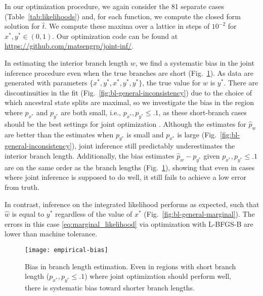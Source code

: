 \documentclass[11pt]{article}
\begin{document}
In our optimization procedure, we again consider the 81 separate cases (Table~\ref{tab:likelihoods}) and, for each function, we compute the closed form solution for $\hat{t}$.
We compute these maxima over a lattice in steps of $10^{-2}$ for $x^*,y^*\in(0,1)$.
Our optimization code can be found at \url{https://github.com/matsengrp/joint-inf/}.

In estimating the interior branch length $w$, we find a systematic bias in the joint inference procedure even when the true branches are short (Fig.~\ref{fig:empirical-bias}).
As data are generated with parameters $\{x^*, y^*, x^*, y^*, y^*\}$, the true value for $w$ is $y^*$.
There are discontinuities in the fit (Fig.~\ref{fig:bl-general-inconsistency}) due to the choice of which ancestral state splits are maximal, so we investigate the bias in the region where $p_{x^*}$ and $p_{y^*}$ are both small, i.e., $p_{x^*}, p_{y^*} \le .1$, as these short-branch cases should be the best settings for joint optimization \citep{Sagulenko2018-xl}.
Although the estimates for $\hat{p}_w$ are better than the estimates when $p_{y^*}$ is small and $p_{x^*}$ is large (Fig.~\ref{fig:bl-general-inconsistency}), joint inference still predictably underestimates the interior branch length.
Additionally, the bias estimates $\hat{p}_w-p_{y^*}$ given $p_{x^*}, p_{y^*} \le .1$ are on the same order as the branch lengths (Fig.~\ref{fig:empirical-bias}), showing that even in cases where joint inference is supposed to do well, it still fails to achieve a low error from truth.

In contrast, inference on the integrated likelihood performs as expected, such that $\hat{w}$ is equal to $y^*$ regardless of the value of $x^*$ (Fig.~\ref{fig:bl-general-marginal}).
The errors in this case \eqref{eq:marginal_likelihood} via optimization with L-BFGS-B are lower than machine tolerance.


\begin{figure}
\centering
\texttt{[image: empirical-bias]}
\caption{
Bias in branch length estimation.
Even in regions with short branch length ($p_{x^*}, p_{y^*} \le .1$) where joint optimization should perform well, there is systematic bias toward shorter branch lengths.
}
\label{fig:empirical-bias}
\end{figure}
\end{document}
